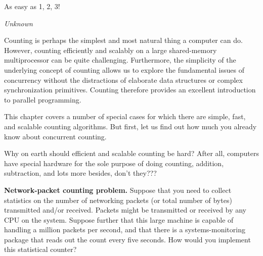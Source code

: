 

\epigraph{As easy as 1, 2, 3!}{\emph{Unknown}}

Counting is perhaps the simplest and most natural thing a computer can do.
However, counting efficiently and scalably on a large
shared-memory multiprocessor can be quite challenging.
Furthermore, the simplicity of the underlying concept of counting
allows us to explore the fundamental issues of concurrency without
the distractions
of elaborate data structures or complex synchronization primitives.
Counting therefore provides an excellent introduction to
parallel programming.

This chapter covers a number of special cases for which there are simple,
fast, and scalable counting algorithms.
But first, let us find out how much you already know about concurrent
counting.

\QuickQuiz{}
	Why on earth should efficient and scalable counting be hard?
	After all, computers have special hardware for the sole purpose
	of doing counting,
	addition, subtraction, and lots more besides, don't they???
 \QuickQuizEnd

\QuickQuiz{}
	{ \bfseries Network-packet counting problem. }
	Suppose that you need to collect statistics on the number
	of networking packets (or total number of bytes) transmitted
	and/or received.
	Packets might be transmitted or received by any CPU on
	the system.
	Suppose further that this large machine is capable of
	handling a million packets per second, and that there
	is a systems-monitoring package that reads out the count
	every five seconds.
	How would you implement this statistical counter?
 \QuickQuizEnd

